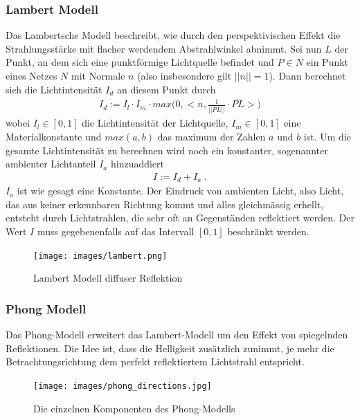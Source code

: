 \subsubsection{Lambert  Modell}
Das Lambertsche Modell beschreibt, wie durch den perspektivischen Effekt die Strahlungsstärke mit flacher werdendem Abstrahlwinkel abnimmt. Sei nun $L$ der Punkt, an dem sich eine punktförmige Lichtquelle befindet und $P \in N$ ein Punkt eines Netzes $N$ mit Normale $n$ (also insbesondere gilt $||n|| = 1$).  Dann berechnet sich die Lichtintensität $I_d$ an diesem Punkt durch
\begin{align*}
I_d :=  I_l \cdot I_m \cdot max\biggl ( 0, \biggl< n, \frac{1}{||\overline{PL}||} \cdot \overline{PL} \biggr> \biggr)
\end{align*}
wobei $I_l \in [0,1]$ die Lichtintensität der Lichtquelle, $I_m \in [0,1]$ eine Materialkonstante und $max(a,b)$ das maximum der Zahlen $a$ und $b$ ist. 
Um die gesamte Lichtintensität zu berechnen wird noch ein konstanter, sogenannter ambienter Lichtanteil $I_a$ hinzuaddiert
\begin{align}
I := I_d + I_a \;.
\end{align} 
$I_a$ ist wie gesagt eine Konstante.
 Der Eindruck von ambienten Licht, also Licht, das aus keiner erkennbaren Richtung kommt und alles gleichmässig erhellt, entsteht durch Lichtstrahlen, die sehr oft an Gegenständen reflektiert werden.
Der Wert $I$ muss gegebenenfalls auf das Intervall $[0,1]$ beschränkt werden.
\begin{figure}[H]
    \centering
    \texttt{[image: images/lambert.png]}
    \caption{Lambert Modell diffuser Reflektion}
    \label{fig:reflection-lambert-diffuse-model}
\end{figure}

   
\subsubsection{Phong Modell}
Das Phong-Modell erweitert das  Lambert-Modell um den Effekt von spiegelnden Reflektionen. Die Idee ist, dass die Helligkeit zusätzlich zunimmt, je mehr die Betrachtungsrichtung dem perfekt reflektiertem Lichtstrahl entspricht.  

\begin{figure}[H]
    \centering
    \texttt{[image: images/phong\_directions.jpg]}
    \caption{Die einzelnen Komponenten des Phong-Modells}
    \label{fig:phong-directions}
\end{figure}


